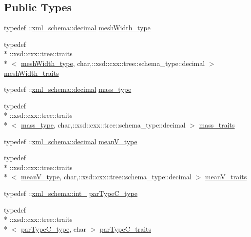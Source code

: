 \subsection*{Public Types}
\begin{DoxyCompactItemize}
\item 
typedef \-::\hyperlink{namespacexml__schema_a69bfaf24f63a8c18ebd8e21db6b343df}{xml\-\_\-schema\-::decimal} \hyperlink{classcuboid__t_a5759759b1b9e3029ff36c7f20d9213dc}{mesh\-Width\-\_\-type}
\item 
typedef \\*
\-::xsd\-::cxx\-::tree\-::traits\\*
$<$ \hyperlink{classcuboid__t_a5759759b1b9e3029ff36c7f20d9213dc}{mesh\-Width\-\_\-type}, char,\-::xsd\-::cxx\-::tree\-::schema\-\_\-type\-::decimal $>$ \hyperlink{classcuboid__t_a7407ec25461e872616716771073fdd6b}{mesh\-Width\-\_\-traits}
\item 
typedef \-::\hyperlink{namespacexml__schema_a69bfaf24f63a8c18ebd8e21db6b343df}{xml\-\_\-schema\-::decimal} \hyperlink{classcuboid__t_a365536fb1db29c6ef0da234297763d61}{mass\-\_\-type}
\item 
typedef \\*
\-::xsd\-::cxx\-::tree\-::traits\\*
$<$ \hyperlink{classcuboid__t_a365536fb1db29c6ef0da234297763d61}{mass\-\_\-type}, char,\-::xsd\-::cxx\-::tree\-::schema\-\_\-type\-::decimal $>$ \hyperlink{classcuboid__t_a3414ba3ff63f2e3abac4ec2f5ff7932d}{mass\-\_\-traits}
\item 
typedef \-::\hyperlink{namespacexml__schema_a69bfaf24f63a8c18ebd8e21db6b343df}{xml\-\_\-schema\-::decimal} \hyperlink{classcuboid__t_aea1381b8b1cca3f677ae4a28b29cbe2a}{mean\-V\-\_\-type}
\item 
typedef \\*
\-::xsd\-::cxx\-::tree\-::traits\\*
$<$ \hyperlink{classcuboid__t_aea1381b8b1cca3f677ae4a28b29cbe2a}{mean\-V\-\_\-type}, char,\-::xsd\-::cxx\-::tree\-::schema\-\_\-type\-::decimal $>$ \hyperlink{classcuboid__t_ad39df1b8bcb315153993a8993dc0828c}{mean\-V\-\_\-traits}
\item 
typedef \-::\hyperlink{namespacexml__schema_acfa24ac68e1a188e7f44c36f7a158bf4}{xml\-\_\-schema\-::int\-\_\-} \hyperlink{classcuboid__t_a162caafd069fa127809bb2d573c752c5}{par\-Type\-C\-\_\-type}
\item 
typedef \\*
\-::xsd\-::cxx\-::tree\-::traits\\*
$<$ \hyperlink{classcuboid__t_a162caafd069fa127809bb2d573c752c5}{par\-Type\-C\-\_\-type}, char $>$ \hyperlink{classcuboid__t_adc1cedef5964dbd3021fa55ee6271554}{par\-Type\-C\-\_\-traits}

\end{DoxyCompactItemize}
